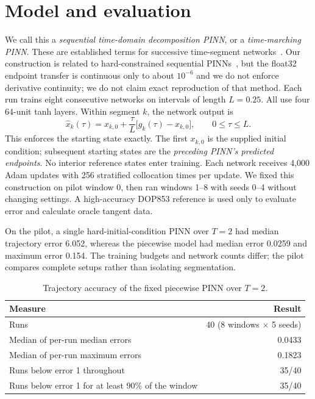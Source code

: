\documentclass[11pt,a4paper]{article}
\begin{document}
\section{Model and evaluation}
We call this a \emph{sequential time-domain decomposition PINN}, or a
\emph{time-marching PINN}. These are established terms for successive
time-segment networks~\cite{penwarden}. Our construction is related to
hard-constrained sequential PINNs~\cite{roy}, but the float32 endpoint
transfer is continuous only to about $10^{-6}$ and we do not enforce
derivative continuity; we do not claim exact reproduction of that method.
Each run trains eight consecutive networks on intervals of length $L=0.25$.
All use four 64-unit tanh layers. Within segment $k$, the network output is
\begin{equation}
\widehat{x}_k(\tau)=x_{k,0}+\frac{\tau}{L}
\bigl[g_k(\tau)-x_{k,0}\bigr],\qquad 0\leq\tau\leq L.
\end{equation}
This enforces the starting state exactly. The first $x_{k,0}$ is the supplied
initial condition; subsequent starting states are the \emph{preceding PINN's
predicted endpoints}. No interior reference states enter training. Each
network receives 4,000 Adam updates with 256 stratified collocation times
per update. We fixed this construction on pilot window 0, then ran windows
1--8 with seeds 0--4 without changing settings. A high-accuracy DOP853
reference is used only to evaluate error and calculate oracle tangent data.

On the pilot, a single hard-initial-condition PINN over $T=2$ had median
trajectory error 6.052, whereas the piecewise model had median error 0.0259
and maximum error 0.154. The training budgets and network counts differ;
the pilot compares complete setups rather than isolating segmentation.

\begin{table}[ht]
\centering
\caption{Trajectory accuracy of the fixed piecewise PINN over $T=2$.}
\begin{tabular}{lr}
\toprule
Measure & Result\\
\midrule
Runs & 40 (8 windows $\times$ 5 seeds)\\
Median of per-run median errors & 0.0433\\
Median of per-run maximum errors & 0.1823\\
Runs below error 1 throughout & 35/40\\
Runs below error 1 for at least 90\% of the window & 35/40\\
\bottomrule
\end{tabular}
\end{table}
\end{document}
